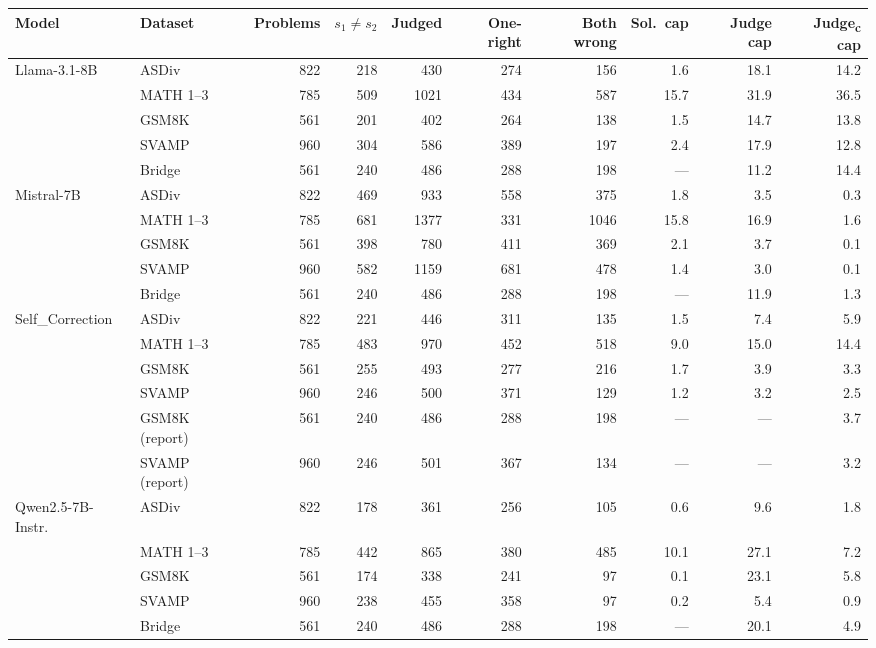 \begin{tabular}{llrrrrrrrr}
\toprule
Model & Dataset & Problems & $s_1\neq s_2$ & Judged & One-right & Both wrong & Sol.\ cap & Judge cap & Judge\textsubscript{c} cap \\
\midrule
Llama-3.1-8B & ASDiv & 822 & 218 & 430 & 274 & 156 & 1.6 & 18.1 & 14.2 \\
 & MATH 1--3 & 785 & 509 & 1021 & 434 & 587 & 15.7 & 31.9 & 36.5 \\
 & GSM8K & 561 & 201 & 402 & 264 & 138 & 1.5 & 14.7 & 13.8 \\
 & SVAMP & 960 & 304 & 586 & 389 & 197 & 2.4 & 17.9 & 12.8 \\
 & Bridge & 561 & 240 & 486 & 288 & 198 & --- & 11.2 & 14.4 \\
Mistral-7B & ASDiv & 822 & 469 & 933 & 558 & 375 & 1.8 & 3.5 & 0.3 \\
 & MATH 1--3 & 785 & 681 & 1377 & 331 & 1046 & 15.8 & 16.9 & 1.6 \\
 & GSM8K & 561 & 398 & 780 & 411 & 369 & 2.1 & 3.7 & 0.1 \\
 & SVAMP & 960 & 582 & 1159 & 681 & 478 & 1.4 & 3.0 & 0.1 \\
 & Bridge & 561 & 240 & 486 & 288 & 198 & --- & 11.9 & 1.3 \\
Self\_Correction & ASDiv & 822 & 221 & 446 & 311 & 135 & 1.5 & 7.4 & 5.9 \\
 & MATH 1--3 & 785 & 483 & 970 & 452 & 518 & 9.0 & 15.0 & 14.4 \\
 & GSM8K & 561 & 255 & 493 & 277 & 216 & 1.7 & 3.9 & 3.3 \\
 & SVAMP & 960 & 246 & 500 & 371 & 129 & 1.2 & 3.2 & 2.5 \\
 & GSM8K (report) & 561 & 240 & 486 & 288 & 198 & --- & --- & 3.7 \\
 & SVAMP (report) & 960 & 246 & 501 & 367 & 134 & --- & --- & 3.2 \\
Qwen2.5-7B-Instr. & ASDiv & 822 & 178 & 361 & 256 & 105 & 0.6 & 9.6 & 1.8 \\
 & MATH 1--3 & 785 & 442 & 865 & 380 & 485 & 10.1 & 27.1 & 7.2 \\
 & GSM8K & 561 & 174 & 338 & 241 & 97 & 0.1 & 23.1 & 5.8 \\
 & SVAMP & 960 & 238 & 455 & 358 & 97 & 0.2 & 5.4 & 0.9 \\
 & Bridge & 561 & 240 & 486 & 288 & 198 & --- & 20.1 & 4.9 \\
\bottomrule
\end{tabular}
